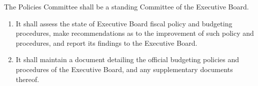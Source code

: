 \item The Policies Committee shall be a standing Committee of the Executive Board.

\begin{enumerate}

\item It shall assess the state of Executive Board fiscal policy and budgeting procedures, make recommendations as to the improvement of such policy and procedures, and report its findings to the Executive Board. 

\item It shall maintain a document detailing the official budgeting policies and procedures of the Executive Board, and any supplementary documents thereof.

\end{enumerate}
